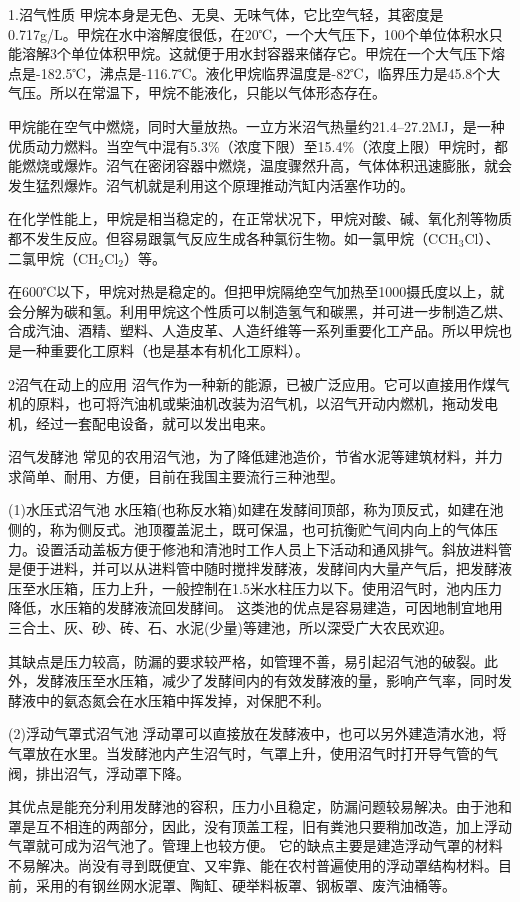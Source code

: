 \documentclass{ctexbook}
\begin{document}
1.沼气性质
甲烷本身是无色、无臭、无味气体，它比空气轻，其密度是0.717g/L。甲烷在水中溶解度很低，在20℃，一个大气压下，100个单位体积水只能溶解3个单位体积甲烷。这就便于用水封容器来储存它。甲烷在一个大气压下熔点是-182.5℃，沸点是-116.7℃。液化甲烷临界温度是-82℃，临界压力是45.8个大气压。所以在常温下，甲烷不能液化，只能以气体形态存在。

甲烷能在空气中燃烧，同时大量放热。一立方米沼气热量约21.4--27.2MJ，是一种优质动力燃料。当空气中混有5.3\%（浓度下限）至15.4\%（浓度上限）甲烷时，都能燃烧或爆炸。沼气在密闭容器中燃烧，温度骤然升高，气体体积迅速膨胀，就会发生猛烈爆炸。沼气机就是利用这个原理推动汽缸内活塞作功的。

在化学性能上，甲烷是相当稳定的，在正常状况下，甲烷对酸、碱、氧化剂等物质都不发生反应。但容易跟氯气反应生成各种氯衍生物。如一氯甲烷（CCH$_3$Cl）、二氯甲烷（CH$_2$Cl$_2$）等。

在600℃以下，甲烷对热是稳定的。但把甲烷隔绝空气加热至1000摄氏度以上，就会分解为碳和氢。利用甲烷这个性质可以制造氢气和碳黑，并可进一步制造乙烘、合成汽油、酒精、塑料、人造皮革、人造纤维等一系列重要化工产品。所以甲烷也是一种重要化工原料（也是基本有机化工原料）。

2沼气在动上的应用
沼气作为一种新的能源，已被广泛应用。它可以直接用作煤气机的原料，也可将汽油机或柴油机改装为沼气机，以沼气开动内燃机，拖动发电机，经过一套配电设备，就可以发出电来。

沼气发酵池
常见的农用沼气池，为了降低建池造价，节省水泥等建筑材料，并力求简单、耐用、方便，目前在我国主要流行三种池型。

(1)水压式沼气池
水压箱(也称反水箱)如建在发酵间顶部，称为顶反式，如建在池侧的，称为侧反式。池顶覆盖泥土，既可保温，也可抗衡贮气间内向上的气体压力。设置活动盖板方便于修池和清池时工作人员上下活动和通风排气。斜放进料管是便于进料，并可以从进料管中随时搅拌发酵液，发酵间内大量产气后，把发酵液压至水压箱，压力上升，一般控制在1.5米水柱压力以下。使用沼气时，池内压力降低，水压箱的发酵液流回发酵间。
这类池的优点是容易建造，可因地制宜地用三合土、灰、砂、砖、石、水泥(少量)等建池，所以深受广大农民欢迎。

其缺点是压力较高，防漏的要求较严格，如管理不善，易引起沼气池的破裂。此外，发酵液压至水压箱，减少了发酵间内的有效发酵液的量，影响产气率，同时发酵液中的氨态氮会在水压箱中挥发掉，对保肥不利。

(2)浮动气罩式沼气池
浮动罩可以直接放在发酵液中，也可以另外建造清水池，将气罩放在水里。当发酵池内产生沼气时，气罩上升，使用沼气时打开导气管的气阀，排出沼气，浮动罩下降。

其优点是能充分利用发酵池的容积，压力小且稳定，防漏问题较易解决。由于池和罩是互不相连的两部分，因此，没有顶盖工程，旧有粪池只要稍加改造，加上浮动气罩就可成为沼气池了。管理上也较方便。
它的缺点主要是建造浮动气罩的材料不易解决。尚没有寻到既便宜、又牢靠、能在农村普遍使用的浮动罩结构材料。目前，采用的有钢丝网水泥罩、陶缸、硬举料板罩、钢板罩、废汽油桶等。
\end{document}
